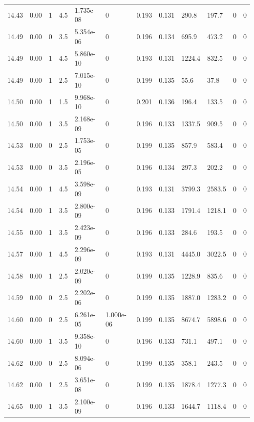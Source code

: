 \documentclass[preview]{standalone}
\begin{document}
{{{{{{{{{{{{{{{\begin{tabular}{L{1.2cm}C{1.2cm} C{0.3cm}C{0.5cm} C{1.4cm}C{1.4cm} C{1.4cm}C{1.4cm} C{1.6cm}C{1.6cm} C{1.6cm}C{1.6cm}}
  14.43  &  0.00  & 1     & 4.5 &  1.735e-08  & 0  &  0.193&   0.131& 290.8 & 197.7   &  0 & 0  \\ 
  14.49  &  0.00  & 0     & 3.5 &  5.354e-06  & 0  &  0.196&   0.134& 695.9 & 473.2   &  0 & 0  \\ 
  14.49  &  0.00  & 1     & 4.5 &  5.860e-10  & 0  &  0.193&   0.131& 1224.4 & 832.5   &  0 & 0  \\ 
  14.49  &  0.00  & 1     & 2.5 &  7.015e-10  & 0  &  0.199&   0.135& 55.6 & 37.8   &  0 & 0  \\ 
  14.50  &  0.00  & 1     & 1.5 &  9.968e-10  & 0  &  0.201&   0.136& 196.4 & 133.5   &  0 & 0  \\ 
  14.50  &  0.00  & 1     & 3.5 &  2.168e-09  & 0  &  0.196&   0.133& 1337.5 & 909.5   &  0 & 0  \\ 
  14.53  &  0.00  & 0     & 2.5 &  1.753e-05  & 0  &  0.199&   0.135& 857.9 & 583.4   &  0 & 0  \\ 
  14.53  &  0.00  & 0     & 3.5 &  2.196e-05  & 0  &  0.196&   0.134& 297.3 & 202.2   &  0 & 0  \\ 
  14.54  &  0.00  & 1     & 4.5 &  3.598e-09  & 0  &  0.193&   0.131& 3799.3 & 2583.5   &  0 & 0  \\ 
  14.54  &  0.00  & 1     & 3.5 &  2.800e-09  & 0  &  0.196&   0.133& 1791.4 & 1218.1   &  0 & 0  \\ 
  14.55  &  0.00  & 1     & 3.5 &  2.423e-09  & 0  &  0.196&   0.133& 284.6 & 193.5   &  0 & 0  \\ 
  14.57  &  0.00  & 1     & 4.5 &  2.296e-09  & 0  &  0.193&   0.131& 4445.0 & 3022.5   &  0 & 0  \\ 
  14.58  &  0.00  & 1     & 2.5 &  2.020e-09  & 0  &  0.199&   0.135& 1228.9 & 835.6   &  0 & 0  \\ 
  14.59  &  0.00  & 0     & 2.5 &  2.202e-06  & 0  &  0.199&   0.135& 1887.0 & 1283.2   &  0 & 0  \\ 
  14.60  &  0.00  & 0     & 2.5 &  6.261e-05  & 1.000e-06  &  0.199&   0.135& 8674.7 & 5898.6   &  0 & 0  \\ 
  14.60  &  0.00  & 1     & 3.5 &  9.358e-10  & 0  &  0.196&   0.133& 731.1 & 497.1   &  0 & 0  \\ 
  14.62  &  0.00  & 0     & 2.5 &  8.094e-06  & 0  &  0.199&   0.135& 358.1 & 243.5   &  0 & 0  \\ 
  14.62  &  0.00  & 1     & 2.5 &  3.651e-08  & 0  &  0.199&   0.135& 1878.4 & 1277.3   &  0 & 0  \\ 
  14.65  &  0.00  & 1     & 3.5 &  2.100e-09  & 0  &  0.196&   0.133& 1644.7 & 1118.4   &  0 & 0  \\ 

\end{tabular}}}}}}}}}}}}}}}}
\end{document}
